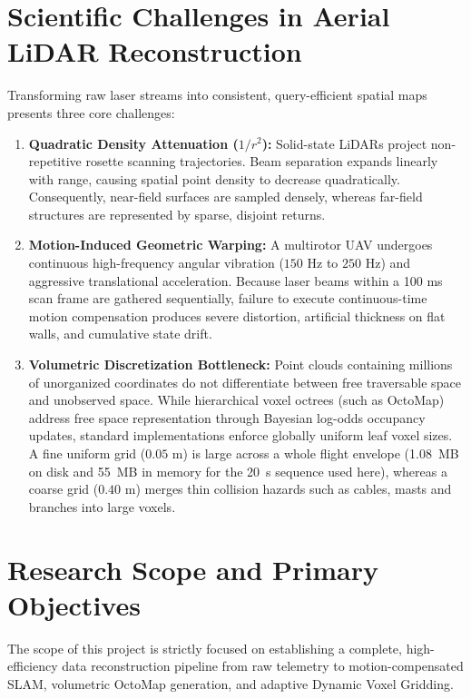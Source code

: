 \documentclass[11pt,a4paper]{report}
\begin{document}
\section{Scientific Challenges in Aerial LiDAR Reconstruction}
Transforming raw laser streams into consistent, query-efficient spatial maps presents three core challenges:
\begin{enumerate}
    \item \textbf{Quadratic Density Attenuation ($1/r^2$):} Solid-state LiDARs project non-repetitive rosette scanning trajectories. Beam separation expands linearly with range, causing spatial point density to decrease quadratically. Consequently, near-field surfaces are sampled densely, whereas far-field structures are represented by sparse, disjoint returns.
    \item \textbf{Motion-Induced Geometric Warping:} A multirotor UAV undergoes continuous high-frequency angular vibration ($150\text{ Hz}$ to $250\text{ Hz}$) and aggressive translational acceleration. Because laser beams within a 100 ms scan frame are gathered sequentially, failure to execute continuous-time motion compensation produces severe distortion, artificial thickness on flat walls, and cumulative state drift.
    \item \textbf{Volumetric Discretization Bottleneck:} Point clouds containing millions of unorganized coordinates do not differentiate between free traversable space and unobserved space. While hierarchical voxel octrees (such as OctoMap) address free space representation through Bayesian log-odds occupancy updates, standard implementations enforce globally uniform leaf voxel sizes. A fine uniform grid ($0.05\text{ m}$) is large across a whole flight envelope (1.08~MB on disk and 55~MB in memory for the 20~s sequence used here), whereas a coarse grid ($0.40\text{ m}$) merges thin collision hazards such as cables, masts and branches into large voxels.
\end{enumerate}

\section{Research Scope and Primary Objectives}
The scope of this project is strictly focused on establishing a complete, high-efficiency data reconstruction pipeline from raw telemetry to motion-compensated SLAM, volumetric OctoMap generation, and adaptive Dynamic Voxel Gridding. 
\end{document}
